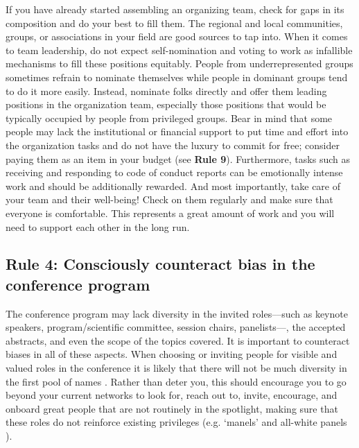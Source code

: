 \documentclass[10pt,letterpaper]{article}
\begin{document}
If you have already started assembling an organizing team, check for gaps in its composition and do your best to fill them. 
The regional and local communities, groups, or associations in your field are good sources to tap into. 
When it comes to team leadership, do not expect self-nomination and voting to work as infallible mechanisms to fill these positions equitably. 
People from underrepresented groups sometimes refrain to nominate themselves while people in dominant groups tend to do it more easily. 
Instead, nominate folks directly and offer them leading positions in the organization team, especially those positions that would be typically occupied by people from privileged groups.
Bear in mind that some people may lack the institutional or financial support to put time and effort into the organization tasks and do not have the luxury to commit for free; consider paying them as an item in your budget (see \textbf{Rule 9}).
Furthermore, tasks such as receiving and responding to code of conduct reports can be emotionally intense work and should be additionally rewarded.
And most importantly, take care of your team and their well-being! Check on them regularly and make sure that everyone is comfortable. This represents a great amount of work and you will need to support each other in the long run.


\subsection*{Rule 4: Consciously counteract bias in the conference program}
\label{rule_unbias}

The conference program may lack diversity in the invited roles––such as keynote speakers, program/scientific committee, session chairs, panelists––, the accepted abstracts, and even the scope of the topics covered. 
It is important to counteract biases in all of these aspects.
When choosing or inviting people for visible and valued roles in the conference it is likely that there will not be much diversity in the first pool of names \cite{dwyerNoticeWhoScience2021,swartzScienceValueDiversity2019,wongBuildDiversityScience2020,dignazioUnicornsJanitorsNinjas2020}. 
Rather than deter you, this should encourage you to go beyond your current networks to look for, reach out to, invite, encourage, and onboard great people that are not routinely in the spotlight, making sure that these roles do not reinforce existing privileges (e.g. `manels' and all-white panels \cite{else_how_2019}).
\end{document}
